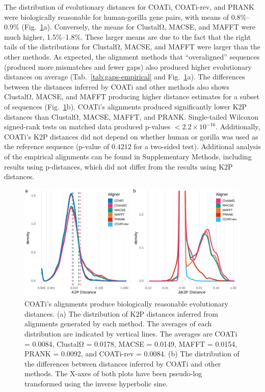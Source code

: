 \documentclass[12pt,letterpaper]{article}
\begin{document}
The distribution of evolutionary distances for COATi, COATi-rev, and PRANK were biologically reasonable for human-gorilla gene pairs, with means of 0.8\%--0.9\% (Fig.~\ref{fig:k2p-empirical}a). Conversely, the means for ClustalΩ, MACSE, and MAFFT were much higher, 1.5\%--1.8\%. These larger means are due to the fact that the right tails of the distributions for ClustalΩ, MACSE, and MAFFT were larger than the other methods. As expected, the alignment methods that ``overaligned'' sequences (produced more mismatches and fewer gaps) also produced higher evolutionary distances on average (Tab.~\ref{tab:gaps-empirical} and Fig.~\ref{fig:k2p-empirical}a). The differences between the distances inferred by COATi and other methods also shows ClustalΩ, MACSE, and MAFFT producing higher distance estimates for a subset of sequences (Fig.~\ref{fig:k2p-empirical}b).
%
COATi's alignments produced significantly lower K2P distances than ClustalΩ, MACSE, MAFFT, and PRANK. Single-tailed Wilcoxon signed-rank tests on matched data produced p-values $< 2.2\times10^{-16}$. Additionally, COATi's K2P distances did not depend on whether human or gorilla was used as the reference sequence (p-value of $0.4212$ for a two-sided test). Additional analysis of the empirical alignments can be found in Supplementary Methods, including results using p-distances, which did not differ from the results using K2P distances.


\begin{figure}[h!]
    \centering%
    \includegraphics{figures/fig-k2p-empirical.pdf}
    \par
    \caption{COATi's alignments produce biologically reasonable evolutionary distances. (a) The distribution of K2P distances inferred from alignments generated by each method. The averages of each distribution are indicated by vertical lines. The averages are COATi = 0.0084, ClustalΩ = 0.0178, MACSE = 0.0149, MAFFT = 0.0154, PRANK = 0.0092, and COATi-rev = 0.0084. (b) The distribution of the differences between distances inferred by COATi and other methods. The X-axes of both plots have been pseudo-log transformed using the inverse hyperbolic sine.\label{fig:k2p-empirical}}
\end{figure}
\end{document}
